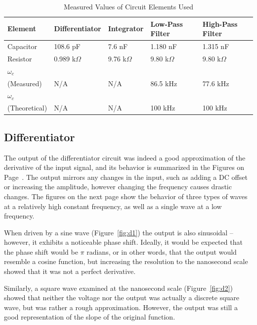 \documentclass[twocolumn,english]{IEEEtran}
\theoremstyle{plain}
\theoremstyle{plain}
\begin{document}
\begin{table}[H]
	\caption{Measured Values of Circuit Elements Used}
	\label{tb:measured_values}
	\begin{tabular}{@{}lllll@{}}

	\toprule
	\textbf{Element}		& \textbf{Differentiator} 	& \textbf{Integrator} 	& \textbf{Low-Pass Filter} 	& \textbf{High-Pass Filter}	\\ \midrule
	{Capacitor}				& 108.6 pF					& 7.6 nF             	& 1.180 nF        			& 1.315 nF           		\\
	{Resistor} 				& 0.989 k$\Omega$ 			& 9.76 k$\Omega$ 		& 9.80 k$\Omega$			& 9.80 k$\Omega$            \\ \midrule
	$\omega_c$ \\(Measured)		& N/A						& N/A					& 86.5 kHz					& 77.6 kHz					\\
	$\omega_c$\\ (Theoretical)	& N/A						& N/A					& 100 kHz					& 100 kHz					\\
	\bottomrule
	\end{tabular}

\end{table}

	\subsection{Differentiator}
	The output of the differentiator circuit was indeed a good approximation of the derivative of the input signal, and its behavior is summarized in the Figures on Page~\pageref{fig:d1}. The output mirrors any changes in the input, such as adding a DC offset or increasing the amplitude, however changing the frequency causes drastic changes. The figures on the next page show the behavior of three types of waves at a relatively high constant frequency, as well as a single wave at a low frequency.

	When driven by a sine wave (Figure~\ref{fig:d1}) the output is also sinusoidal -- however, it exhibits a noticeable phase shift. Ideally, it would be expected that the phase shift would be $\pi$ radians, or in other words, that the output would resemble a cosine function, but increasing the resolution to the nanosecond scale showed that it was not a perfect derivative.

	Similarly, a square wave examined at the nanosecond scale (Figure~\ref{fig:d2}) showed that neither the voltage nor the output was actually a discrete square wave, but was rather a rough approximation. However, the output was still a good representation of the slope of the original function.
\end{document}
